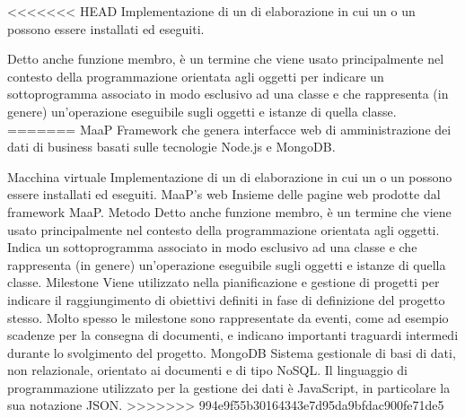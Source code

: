 <<<<<<< HEAD
{Implementazione  di un  di elaborazione in cui un  o un  possono essere installati ed eseguiti.}

{Detto anche funzione membro, è un termine che viene usato principalmente nel contesto della programmazione orientata agli oggetti per indicare un sottoprogramma associato in modo esclusivo ad una classe e che rappresenta (in genere) un'operazione eseguibile sugli oggetti e istanze di quella classe.}
=======
\elemento
{MaaP}
{Framework che genera interfacce web di amministrazione dei dati di business basati sulle tecnologie Node.js e MongoDB. }

\elemento
{Macchina virtuale} 
{Implementazione  di un  di elaborazione in cui un  o un  possono essere installati ed eseguiti.}
\elemento
{MaaP's web}
{Insieme delle pagine web prodotte dal framework MaaP.}
\elemento
{Metodo}
{Detto anche funzione membro, è un termine che viene usato principalmente nel contesto della programmazione orientata agli oggetti. Indica un sottoprogramma associato in modo esclusivo ad una classe e che rappresenta (in genere) un'operazione eseguibile sugli oggetti e istanze di quella classe.}
\elemento
{Milestone}
{Viene utilizzato nella pianificazione e gestione di progetti per indicare il raggiungimento di obiettivi definiti in fase di definizione del progetto stesso. Molto spesso le milestone sono rappresentate da eventi, come ad esempio scadenze per la consegna di documenti, e indicano importanti traguardi intermedi durante lo svolgimento del progetto.}
\elemento
{MongoDB}
{Sistema gestionale di basi di dati, non relazionale, orientato ai documenti e di tipo NoSQL. Il linguaggio di programmazione utilizzato per la gestione dei dati è JavaScript, in particolare la sua notazione JSON.}
>>>>>>> 994e9f55b30164343e7d95da9bfdac900fe71de5
